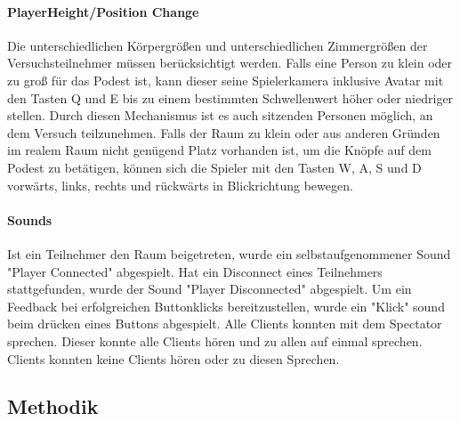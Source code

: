 \documentclass[a4paper,11pt]{article}%
\renewcommand{\\}{\vspace*{0.5\baselineskip} \newline}
\begin{document}
\paragraph{PlayerHeight/Position Change}
Die unterschiedlichen Körpergrößen und unterschiedlichen Zimmergrößen der Versuchsteilnehmer müssen berücksichtigt werden.
Falls eine Person zu klein oder zu groß für das Podest ist, kann dieser seine Spielerkamera inklusive Avatar mit den Tasten Q und E bis zu einem bestimmten Schwellenwert höher oder niedriger stellen. Durch diesen Mechanismus ist es auch sitzenden Personen möglich, an dem Versuch teilzunehmen.
Falls der Raum zu klein oder aus anderen Gründen im realem Raum nicht genügend Platz vorhanden ist, um die Knöpfe auf dem Podest zu betätigen, können sich die Spieler mit den Tasten W, A, S und D vorwärts, links, rechts und rückwärts in Blickrichtung bewegen.

\paragraph{Sounds}
Ist ein Teilnehmer den Raum beigetreten, wurde ein selbstaufgenommener Sound "Player Connected" abgespielt. Hat ein Disconnect eines Teilnehmers stattgefunden, wurde der Sound "Player Disconnected" abgespielt.
Um ein Feedback bei erfolgreichen Buttonklicks bereitzustellen, wurde ein "Klick" sound beim drücken eines Buttons abgespielt.
Alle Clients konnten mit dem Spectator sprechen. Dieser konnte alle Clients hören und zu allen auf einmal sprechen. Clients konnten keine Clients hören oder zu diesen Sprechen.

\newpage	
\subsection{Methodik}
\end{document}
